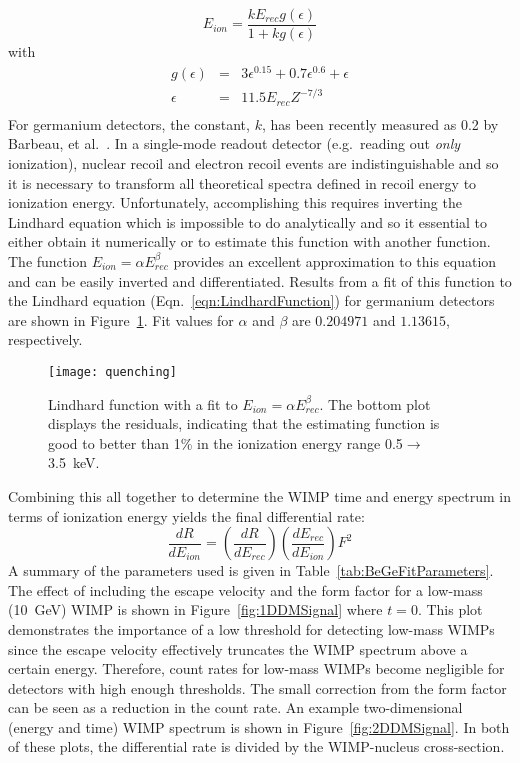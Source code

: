 		\begin{equation}
			E_{ion} =  \frac{k E_{rec} g(\epsilon)}{1 + k g(\epsilon)}
			\label{eqn:LindhardFunction}
		\end{equation}
with 
		\begin{eqnarray*}
			g(\epsilon) & = & 3 \epsilon^{0.15} + 0.7\epsilon^{0.6} + \epsilon \\		
			\epsilon & = & 11.5 E_{rec} Z^{-7/3} \\
		\end{eqnarray*}
For germanium detectors, the constant, $k$, has been recently measured as 0.2 by Barbeau, et al.~\cite{Barbeau:2009fk}.  In a single-mode readout detector (e.g.~reading out \emph{only} ionization), nuclear recoil and electron recoil events are indistinguishable and so it is necessary to transform all theoretical spectra defined in recoil energy to ionization energy.  Unfortunately, accomplishing this requires inverting the Lindhard equation which is impossible to do analytically and so it essential to either obtain it numerically or to estimate this function with another function.  The function $E_{ion} =  \alpha E_{rec}^{\beta}$ provides an excellent approximation to this equation and can be easily inverted and differentiated.  Results from a fit of this function to the Lindhard equation (Eqn.~\ref{eqn:LindhardFunction}) for germanium detectors are shown in Figure~\ref{fig:LindhardFitResults}.  Fit values for $\alpha$ and $\beta$ are $0.204971$ and $1.13615$, respectively.

		\begin{figure}
			\centering
			\texttt{[image: quenching]}
			\caption[Lindhard function with a fit to $E_{ion} =  \alpha E_{rec}^{\beta}$]
			{Lindhard function with a fit to $E_{ion} =  \alpha E_{rec}^{\beta}$.  
			The bottom plot displays the residuals, 
			indicating that the estimating function is good to better than 1\% in the 
			ionization energy range 0.5$\to$3.5~keV.}
			\label{fig:LindhardFitResults}
		\end{figure}
Combining this all together to determine the WIMP time and energy spectrum in terms of ionization energy yields the final differential rate:
		\begin{equation}
				\frac{dR}{dE_{ion}}  = \left(\frac{dR}{dE_{rec}} \right) \left(\frac{dE_{rec}}{dE_{ion}} \right) F^{2}
			\label{eqn:FinalFitSpectrum}
		\end{equation}	
A summary of the parameters used is given in Table~\ref{tab:BeGeFitParameters}.  The effect of including the escape velocity and the form factor for a low-mass (10~GeV) WIMP is shown in Figure~\ref{fig:1DDMSignal} where $t=0$.  This plot demonstrates the importance of a low threshold for detecting low-mass WIMPs since the escape velocity effectively truncates the WIMP spectrum above a certain energy.  Therefore, count rates for low-mass WIMPs become negligible for detectors with high enough thresholds.  The small correction from the form factor can be seen as a reduction in the count rate.  An example two-dimensional (energy and time) WIMP spectrum is shown in Figure~\ref{fig:2DDMSignal}.  In both of these plots, the differential rate is divided by the WIMP-nucleus cross-section.

